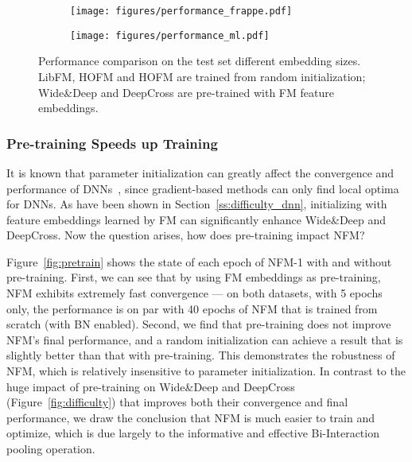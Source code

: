 \begin{figure*}[t]
	\centering
	\begin{subfigure}[b]{0.36\textwidth}
		\centering
		\texttt{[image: figures/performance\_frappe.pdf]}
		\vspace{-15pt}
\label{fig:performance_frappe}
	\end{subfigure} \hspace{+55pt}
	\begin{subfigure}[b]{0.36\textwidth}
		\centering
		\texttt{[image: figures/performance\_ml.pdf]}
		\vspace{-15pt}
\label{fig:performance_ml}
	\end{subfigure} \hspace{+7pt}
	\caption{Performance comparison on the test set \wrt different embedding sizes. LibFM, HOFM and HOFM are trained from random initialization; Wide\&Deep and DeepCross are pre-trained with FM feature embeddings.}
	\vspace{-10pt}
	\label{fig:performance}
\end{figure*}

\subsubsection{\textbf{Pre-training Speeds up Training}}
It is known that parameter initialization can greatly affect the convergence and performance of DNNs~\cite{erhan2010pretrain,He:WWW2017}, since gradient-based methods can only find local optima for DNNs. 
As have been shown in Section~\ref{ss:difficulty_dnn}, initializing with feature embeddings learned by FM can significantly enhance Wide\&Deep and DeepCross. Now the question arises, how does pre-training impact NFM? 

Figure~\ref{fig:pretrain} shows the state of each epoch of NFM-1 with and without pre-training.
First, we can see that by using FM embeddings as pre-training, NFM exhibits extremely fast convergence --- on both datasets, with 5 epochs only, the performance is on par with 40 epochs of NFM that is trained from scratch (with BN enabled).
Second, we find that pre-training does not improve NFM's final performance, and a random initialization can achieve a result that is slightly better than that with pre-training. 
This demonstrates the robustness of NFM, which is relatively insensitive to parameter initialization. 
In contrast to the huge impact of pre-training on Wide\&Deep and DeepCross (\cf Figure~\ref{fig:difficulty}) that improves both their convergence and final performance, we draw the conclusion that NFM is much easier to train and optimize, which is due largely to the informative and effective Bi-Interaction pooling operation. \vspace{-5pt}

